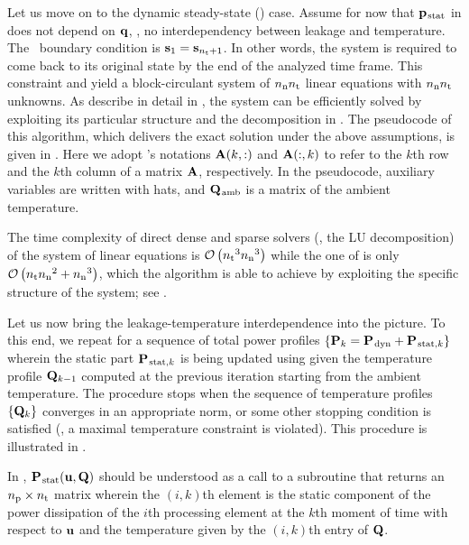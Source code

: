 Let us move on to the dynamic steady-state (\DSS) case.
Assume for now that $\mathbf{p}_{\text{\kern0.1emstat}}$ in  does not depend on $\mathbf{q}$, \ie, no interdependency between leakage and temperature.
The \DSS\ boundary condition is $\mathbf{s}_1 = \mathbf{s}_{{n_\text{t}} + 1}$.
In other words, the system is required to come back to its original state by the end of the analyzed time frame.
This constraint and  yield a block-circulant system of ${n_\text{n}} {n_\text{t}}$ linear equations with ${n_\text{n}} {n_\text{t}}$ unknowns.
As describe in detail in \cite{ukhov2012}, the system can be efficiently solved by exploiting its particular structure and the decomposition in .
The pseudocode of this algorithm, which delivers the exact solution under the above assumptions, is given in .
Here we adopt 's \cite{matlab} notations $\mathbf{A}(k, :)$ and $\mathbf{A}(:, k)$ to refer to the $k$th row and the $k$th column of a matrix $\mathbf{A}$, respectively.
In the pseudocode, auxiliary variables are written with hats, and $\mathbf{Q}_{\text{\kern0.1emamb}}$ is a matrix of the ambient temperature.

\begin{remark}
The time complexity of  direct dense and sparse solvers (\eg, the LU decomposition) of the system of linear equations is $\mathcal{O}\left( {n_\text{t}}^3 {n_\text{n}}^3 \right)$ while the one of  is only $\mathcal{O}\left( {n_\text{t}} {n_\text{n}}^2 + {n_\text{n}}^3 \right)$, which the algorithm is able to achieve by exploiting the specific structure of the system; see \cite{ukhov2012}.
\end{remark}

Let us now bring the leakage-temperature interdependence into the picture.
To this end, we repeat  for a sequence of total power profiles $\{ \mathbf{P}_k = \mathbf{P}_{\text{\kern0.1emdyn}} + \mathbf{P}_{\text{\kern0.1emstat}, k} \}$ wherein the static part $\mathbf{P}_{\text{\kern0.1emstat}, k}$ is being updated using  given the temperature profile $\mathbf{Q}_{k - 1}$ computed at the previous iteration starting from the ambient temperature.
The procedure stops when the sequence of temperature profiles $\{ \mathbf{Q}_k \}$ converges in an appropriate norm, or some other stopping condition is satisfied (\eg, a maximal temperature constraint is violated).
This procedure is illustrated in .


In , $\mathbf{P}_{\text{\kern0.1emstat}}(\mathbf{u}, \mathbf{Q})$ should be understood as a call to a subroutine that returns an ${n_\text{p}} \times {n_\text{t}}$ matrix wherein the $(i, k)$th element is the static component of the power dissipation of the $i$th processing element at the $k$th moment of time with respect to $\mathbf{u}$ and the temperature given by the $(i, k)$th entry of $\mathbf{Q}$.

